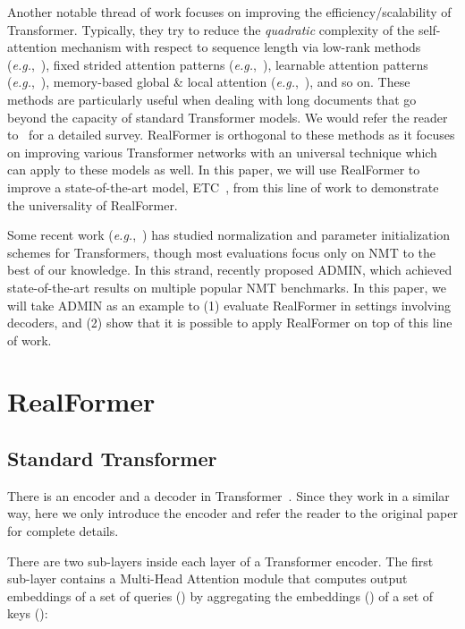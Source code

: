 \documentclass[11pt,a4paper]{article}
\begin{document}
Another notable thread of work focuses on improving the efficiency/scalability of Transformer. Typically, they try to reduce the \emph{quadratic} complexity of the self-attention mechanism with respect to sequence length via low-rank methods (\emph{e.g.},~\citet{Wang-2020-linformer}), fixed strided attention patterns (\emph{e.g.},~\citet{Child-2019-sparsetransformer}), learnable attention patterns (\emph{e.g.},~\citet{Kitaev-2020-reformer, Roy-2020-routingtransformer}), memory-based global \& local attention (\emph{e.g.},~\citet{Ainslie-2020-etc, Beltagy-2020-longformer, Zaheer-2020-bigbird}), and so on. 
These methods are particularly useful when dealing with long documents that go beyond the capacity of standard Transformer models. We would refer the reader to~\citet{Tay-2020-survey} for a detailed survey.
RealFormer is orthogonal to these methods as it focuses on improving various Transformer networks with an universal technique which can apply to these models as well. 
In this paper, we will use RealFormer to improve a state-of-the-art model, ETC~\citep{Ainslie-2020-etc}, from this line of work to demonstrate the universality of RealFormer.

Some recent work (\emph{e.g.},~\citet{Wang-2019-deeppreln, Xiong-2020-preln, Zhang-2018-fixup, Huang-2020-tfixup, Zhang-2019-mergedattn}) has studied normalization and parameter initialization schemes for Transformers, though most evaluations focus only on NMT to the best of our knowledge. 
In this strand, \citet{Liu-2020-admin} recently proposed ADMIN, which achieved state-of-the-art results on multiple popular NMT benchmarks. 
In this paper, we will take ADMIN as an example to (1) evaluate RealFormer in settings involving decoders, and (2) show that it is possible to apply RealFormer on top of this line of work.


\section{RealFormer}
\subsection{Standard Transformer}
There is an encoder and a decoder in Transformer~\citep{Vaswani-2017-attention}. Since they work in a similar way, here we only introduce the encoder and refer the reader to the original paper for complete details.

There are two sub-layers inside each layer of a Transformer encoder. The first sub-layer contains a Multi-Head Attention module that computes output embeddings of a set of queries () by aggregating the embeddings () of a set of keys ():
\end{document}

